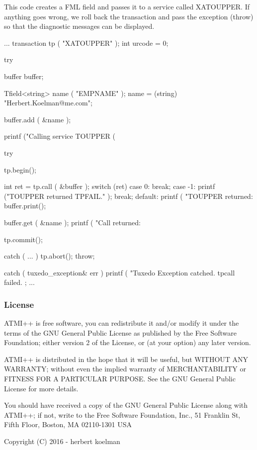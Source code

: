 This code creates a F\+M\+L field and passes it to a service called {\ttfamily X\+A\+T\+O\+U\+P\+P\+E\+R}. If anything goes wrong, we roll back the transaction and pass the exception ({\ttfamily throw}) so that the diagnostic messages can be displayed. \begin{DoxyVerb}    ...
    transaction tp ( "XATOUPPER" );
    int urcode = 0;

    try {

      buffer buffer;

      Tfield<string> name ( "EMPNAME" );
      name = (string) "Herbert.Koelman@me.com";

      buffer.add ( &name );

      printf ("Calling service TOUPPER (%

      try {

        tp.begin();

        int ret = tp.call ( &buffer );
        switch (ret) {
          case 0:
            break;
          case -1:
            printf ("TOUPPER returned TPFAIL.\n" );
            break;
          default:
            printf ( "TOUPPER returned: %
            buffer.print();
        }

        buffer.get ( &name );
        printf ( "Call returned: %

        tp.commit();
      } catch ( ... ){
        tp.abort();
        throw;
      }

    } catch ( tuxedo_exception& err ) {
      printf ( "Tuxedo Exception catched. tpcall failed. %
    };
    ...
\end{DoxyVerb}


\subsubsection*{License}





A\+T\+M\+I++ is free software, you can redistribute it and/or modify it under the terms of the G\+N\+U General Public License as published by the Free Software Foundation; either version 2 of the License, or (at your option) any later version.

A\+T\+M\+I++ is distributed in the hope that it will be useful, but W\+I\+T\+H\+O\+U\+T A\+N\+Y W\+A\+R\+R\+A\+N\+T\+Y; without even the implied warranty of M\+E\+R\+C\+H\+A\+N\+T\+A\+B\+I\+L\+I\+T\+Y or F\+I\+T\+N\+E\+S\+S F\+O\+R A P\+A\+R\+T\+I\+C\+U\+L\+A\+R P\+U\+R\+P\+O\+S\+E. See the G\+N\+U General Public License for more details.

You should have received a copy of the G\+N\+U General Public License along with A\+T\+M\+I++; if not, write to the Free Software Foundation, Inc., 51 Franklin St, Fifth Floor, Boston, M\+A 02110-\/1301 U\+S\+A 

 Copyright (C) 2016 -\/ herbert koelman 